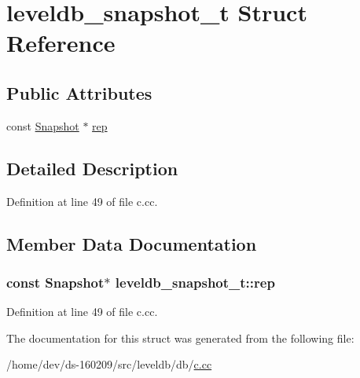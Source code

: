 \hypertarget{structleveldb__snapshot__t}{}\section{leveldb\+\_\+snapshot\+\_\+t Struct Reference}
\label{structleveldb__snapshot__t}
\subsection*{Public Attributes}
\begin{DoxyCompactItemize}
\item 
const \hyperlink{classleveldb_1_1_snapshot}{Snapshot} $\ast$ \hyperlink{structleveldb__snapshot__t_a36f57ffdcd88fa73322d8e2e637e3b6a}{rep}
\end{DoxyCompactItemize}


\subsection{Detailed Description}


Definition at line 49 of file c.\+cc.



\subsection{Member Data Documentation}
\hypertarget{structleveldb__snapshot__t_a36f57ffdcd88fa73322d8e2e637e3b6a}{}
\subsubsection[{rep}]{\setlength{\rightskip}{0pt plus 5cm}const {\bf Snapshot}$\ast$ leveldb\+\_\+snapshot\+\_\+t\+::rep}\label{structleveldb__snapshot__t_a36f57ffdcd88fa73322d8e2e637e3b6a}


Definition at line 49 of file c.\+cc.



The documentation for this struct was generated from the following file\+:\begin{DoxyCompactItemize}
\item 
/home/dev/ds-\/160209/src/leveldb/db/\hyperlink{c_8cc}{c.\+cc}\end{DoxyCompactItemize}
